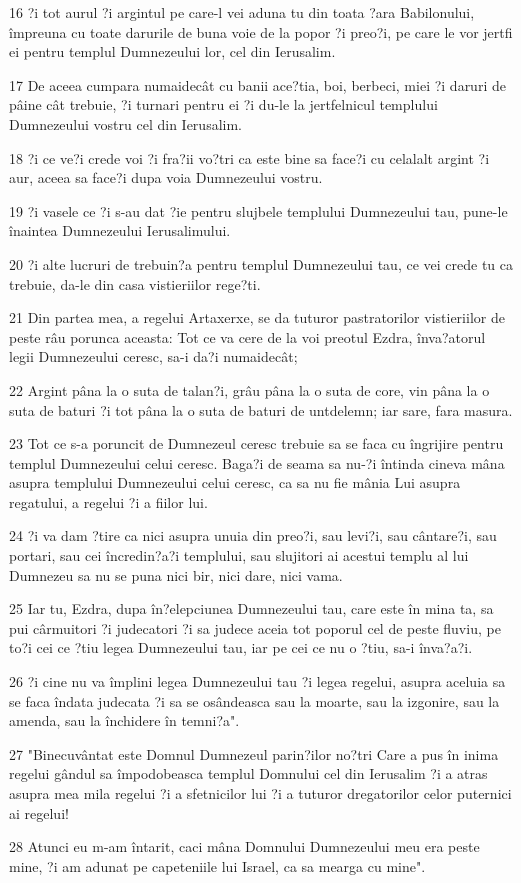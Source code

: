 \par 16 ?i tot aurul ?i argintul pe care-l vei aduna tu din toata ?ara Babilonului, împreuna cu toate darurile de buna voie de la popor ?i preo?i, pe care le vor jertfi ei pentru templul Dumnezeului lor, cel din Ierusalim.
\par 17 De aceea cumpara numaidecât cu banii ace?tia, boi, berbeci, miei ?i daruri de pâine cât trebuie, ?i turnari pentru ei ?i du-le la jertfelnicul templului Dumnezeului vostru cel din Ierusalim.
\par 18 ?i ce ve?i crede voi ?i fra?ii vo?tri ca este bine sa face?i cu celalalt argint ?i aur, aceea sa face?i dupa voia Dumnezeului vostru.
\par 19 ?i vasele ce ?i s-au dat ?ie pentru slujbele templului Dumnezeului tau, pune-le înaintea Dumnezeului Ierusalimului.
\par 20 ?i alte lucruri de trebuin?a pentru templul Dumnezeului tau, ce vei crede tu ca trebuie, da-le din casa vistieriilor rege?ti.
\par 21 Din partea mea, a regelui Artaxerxe, se da tuturor pastratorilor vistieriilor de peste râu porunca aceasta: Tot ce va cere de la voi preotul Ezdra, înva?atorul legii Dumnezeului ceresc, sa-i da?i numaidecât;
\par 22 Argint pâna la o suta de talan?i, grâu pâna la o suta de core, vin pâna la o suta de baturi ?i tot pâna la o suta de baturi de untdelemn; iar sare, fara masura.
\par 23 Tot ce s-a poruncit de Dumnezeul ceresc trebuie sa se faca cu îngrijire pentru templul Dumnezeului celui ceresc. Baga?i de seama sa nu-?i întinda cineva mâna asupra templului Dumnezeului celui ceresc, ca sa nu fie mânia Lui asupra regatului, a regelui ?i a fiilor lui.
\par 24 ?i va dam ?tire ca nici asupra unuia din preo?i, sau levi?i, sau cântare?i, sau portari, sau cei încredin?a?i templului, sau slujitori ai acestui templu al lui Dumnezeu sa nu se puna nici bir, nici dare, nici vama.
\par 25 Iar tu, Ezdra, dupa în?elepciunea Dumnezeului tau, care este în mina ta, sa pui cârmuitori ?i judecatori ?i sa judece aceia tot poporul cel de peste fluviu, pe to?i cei ce ?tiu legea Dumnezeului tau, iar pe cei ce nu o ?tiu, sa-i înva?a?i.
\par 26 ?i cine nu va împlini legea Dumnezeului tau ?i legea regelui, asupra aceluia sa se faca îndata judecata ?i sa se osândeasca sau la moarte, sau la izgonire, sau la amenda, sau la închidere în temni?a".
\par 27 "Binecuvântat este Domnul Dumnezeul parin?ilor no?tri Care a pus în inima regelui gândul sa împodobeasca templul Domnului cel din Ierusalim ?i a atras asupra mea mila regelui ?i a sfetnicilor lui ?i a tuturor dregatorilor celor puternici ai regelui!
\par 28 Atunci eu m-am întarit, caci mâna Domnului Dumnezeului meu era peste mine, ?i am adunat pe capeteniile lui Israel, ca sa mearga cu mine".


